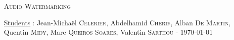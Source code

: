 \documentclass[a4paper,11pt,oneside]{report}
\begin{document}
\begin{titlepage}
  \begin{center}

    \textsc{\LARGE Audio Watermarking}\\[1cm]
    
  \end{center}
  
  \begin{flushbottom}
   \begin{flushleft}
    \underline{Students} : Jean-Michaël \textsc{Celerier}, Abdelhamid \textsc{Cherif}, Alban \textsc{De Martin}, Quentin \textsc{Midy}, Marc \textsc{Queiros Soares}, Valentin \textsc{Sarthou} - \today \\
   \end{flushleft}
  \end{flushbottom}
\end{titlepage}
\clearpage
\tableofcontents
\listoffigures










\printglossaries


\end{document}
